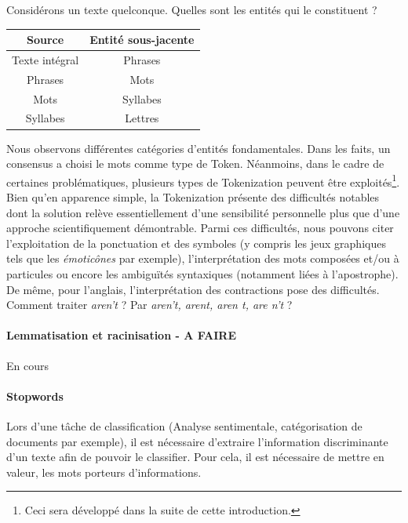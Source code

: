 \noindent Considérons un texte quelconque. Quelles sont les entités qui le constituent ?\\

\begin{tabular}{|c|c|}
    \hline
     Source &  Entité sous-jacente\\
     \hline
     Texte intégral & Phrases\\
     \hline
     Phrases & Mots\\
     \hline
     Mots & Syllabes\\
     \hline
     Syllabes & Lettres\\
     \hline
\end{tabular}
\bigbreak
\noindent Nous observons différentes catégories d'entités fondamentales. Dans les faits, un consensus a choisi le mots comme type de Token. Néanmoins, dans le cadre de certaines problématiques, plusieurs types de Tokenization peuvent être exploités\footnote{Ceci sera développé dans la suite de cette introduction.}.\\

\noindent Bien qu'en apparence simple, la Tokenization présente des difficultés notables dont la solution relève essentiellement d'une sensibilité personnelle plus que d'une approche scientifiquement démontrable. Parmi ces difficultés, nous pouvons citer l'exploitation de la ponctuation et des symboles (y compris les jeux graphiques tels que les \textit{émoticônes} par exemple), l'interprétation des mots composées et/ou à particules ou encore les ambiguïtés syntaxiques (notamment liées à l'apostrophe). De même, pour l'anglais, l'interprétation des contractions pose des difficultés. Comment traiter \textit{aren't} ? Par \textit{aren't, arent, aren t, are n't} ?\\

\paragraph{Lemmatisation et racinisation - A FAIRE}
En cours
\paragraph{Stopwords}
Lors d'une tâche de classification (Analyse sentimentale, catégorisation de documents par exemple), il est nécessaire d'extraire l'information discriminante d'un texte afin de pouvoir le classifier. Pour cela, il est nécessaire de mettre en valeur, les mots porteurs d'informations.\\

